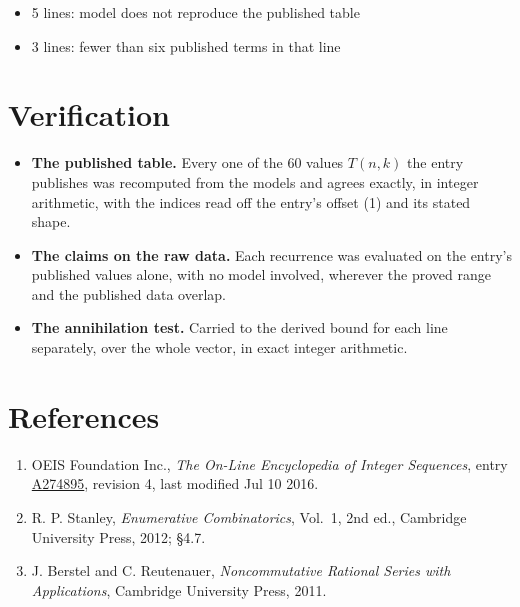 \documentclass[11pt]{article}
\theoremstyle{definition}
\begin{document}
\begin{itemize}

\item 5 lines: model does not reproduce the published table

\item 3 lines: fewer than six published terms in that line

\end{itemize}

\section{Verification}

\begin{itemize}

\item {\bfseries The published table.} Every one of the 60 values $T(n,k)$ the entry publishes was recomputed from the models and agrees exactly, in integer arithmetic, with the indices read off the entry's offset (1) and its stated shape.

\item {\bfseries The claims on the raw data.} Each recurrence was evaluated on the entry's published values alone, with no model involved, wherever the proved range and the published data overlap.

\item {\bfseries The annihilation test.} Carried to the derived bound for each line separately, over the whole vector, in exact integer arithmetic.

\end{itemize}

\section{References}

\begin{enumerate}

\item OEIS Foundation Inc., \emph{The On-Line Encyclopedia of Integer Sequences}, entry \href{https://oeis.org/A274895}{A274895}, revision 4, last modified Jul 10 2016.

\item R. P. Stanley, \emph{Enumerative Combinatorics}, Vol.~1, 2nd ed., Cambridge University Press, 2012; \S4.7.

\item J. Berstel and C. Reutenauer, \emph{Noncommutative Rational Series with Applications}, Cambridge University Press, 2011.

\end{enumerate}
\end{document}
